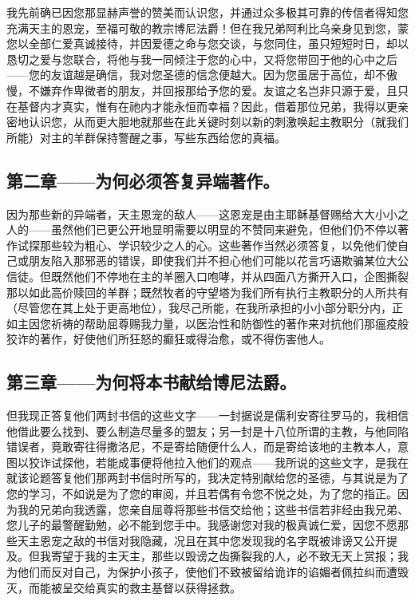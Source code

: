 我先前确已因您那显赫声誉的赞美而认识您，并通过众多极其可靠的传信者得知您充满天主的恩宠，至福可敬的教宗博尼法爵！但在我兄弟阿利比乌亲身见到您，蒙您以全部仁爱真诚接待，并因爱德之命与您交谈，与您同住，虽只短短时日，却以恳切之爱与您联合，将他与我一同倾注于您的心中，又将您带回于他的心中之后——您的友谊越是确信，我对您圣德的信念便越大。因为您虽居于高位，却不傲慢，不嫌弃作卑微者的朋友，并回报那给予您的爱。友谊之名岂非只源于爱，且只在基督内才真实，惟有在祂内才能永恒而幸福？因此，借着那位兄弟，我得以更亲密地认识您，从而更大胆地就那些在此关键时刻以新的刺激唤起主教职分（就我们所能）对主的羊群保持警醒之事，写些东西给您的真福。\par


\subsection{第二章——为何必须答复异端著作。}

因为那些新的异端者，天主恩宠的敌人——这恩宠是由主耶稣基督赐给大大小小之人的——虽然他们已更公开地显明需要以明显的不赞同来避免，但他们仍不停以著作试探那些较为粗心、学识较少之人的心。这些著作当然必须答复，以免他们使自己或朋友陷入那邪恶的错误，即使我们并不担心他们可能以花言巧语欺骗某位大公信徒。但既然他们不停地在主的羊圈入口咆哮，并从四面八方撕开入口，企图撕裂那以如此高价赎回的羊群；既然牧者的守望塔为我们所有执行主教职分的人所共有（尽管您在其上处于更高地位），我尽己所能，在我所承担的小小部分职分内，正如主因您祈祷的帮助屈尊赐我力量，以医治性和防御性的著作来对抗他们那瘟疫般狡诈的著作，好使他们所狂怒的癫狂或得治愈，或不得伤害他人。\par


\subsection{第三章——为何将本书献给博尼法爵。}

但我现正答复他们两封书信的这些文字——一封据说是儒利安寄往罗马的，我相信他借此要么找到、要么制造尽量多的盟友；另一封是十八位所谓的主教，与他同陷错误者，竟敢寄往得撒洛尼，不是寄给随便什么人，而是寄给该地的主教本人，意图以狡诈试探他，若能成事便将他拉入他们的观点——我所说的这些文字，是我在就该论题答复他们那两封书信时所写的，我决定特别献给您的圣德，与其说是为了您的学习，不如说是为了您的审阅，并且若偶有令您不悦之处，为了您的指正。因为我的兄弟向我透露，您亲自屈尊将那些书信交给他；这些书信若非经由我兄弟、您儿子的最警醒勤勉，必不能到您手中。我感谢您对我的极真诚仁爱，因您不愿那些天主恩宠之敌的书信对我隐藏，况且在其中您发现我的名字既被诽谤又公开提及。但我寄望于我的主天主，那些以毁谤之齿撕裂我的人，必不致无天上赏报；我为他们而反对自己，为保护小孩子，使他们不致被留给诡诈的谄媚者佩拉纠而遭毁灭，而能被呈交给真实的救主基督以获得拯救。\par

